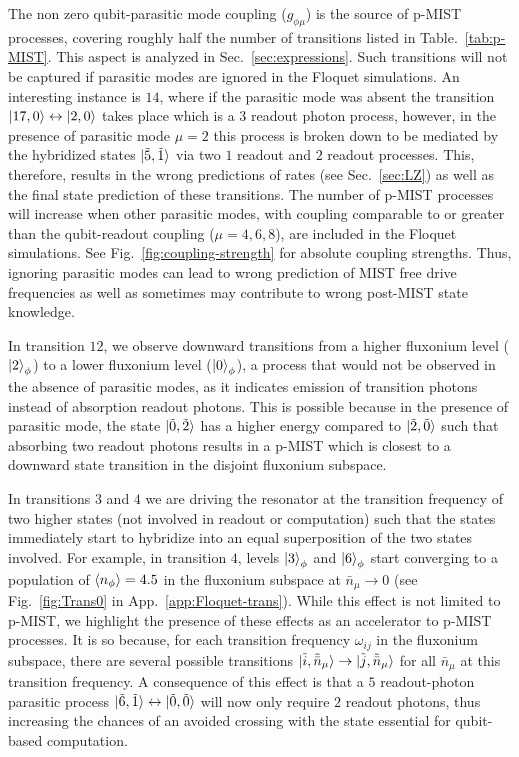 \documentclass[%
reprint,
superscriptaddress,
 amsmath,amssymb,
 aps,
 prx,
longbibliography,
floatfix,
]{revtex4-2}
\begin{document}
The non zero qubit-parasitic mode coupling ($g_{\phi\mu}$) is the source of p-MIST processes, covering roughly half the number of transitions listed in Table.~\ref{tab:p-MIST}. This aspect is analyzed in Sec.~\ref{sec:expressions}. Such transitions will not be captured if parasitic modes are ignored in the Floquet simulations. An interesting instance is $14$, where if the parasitic mode was absent the transition $\ket{17,0}\leftrightarrow \ket{2,0}$ takes place which is a $3$ readout photon process, however, in the presence of parasitic mode $\mu=2$ this process is broken down to be mediated by the hybridized states $\ket{\tilde{5},\tilde{1}}$ via two $1$ readout and $2$ readout processes. This, therefore, results in the wrong predictions of rates (see Sec.~\ref{sec:LZ}) as well as the final state prediction of these transitions. The number of p-MIST processes will increase when other parasitic modes, with coupling comparable to or greater than the qubit-readout coupling ($\mu = 4, 6,8$), are included in the Floquet simulations. See Fig.~\ref{fig:coupling-strength} for absolute coupling strengths. Thus, ignoring parasitic modes can lead to wrong prediction of MIST free drive frequencies as well as sometimes may contribute to wrong post-MIST state knowledge.

In transition $12$, we observe downward transitions from a higher fluxonium level ($\ket{2}_\phi$) to a lower fluxonium level ($\ket{0}_\phi$), a process that would not be observed in the absence of parasitic modes, as it indicates emission of transition photons instead of absorption readout photons. This is possible because in the presence of parasitic mode, the state $\ket{\tilde{0},\tilde{2}}$ has a higher energy compared to $\ket{\tilde{2},\tilde{0}}$ such that absorbing two readout photons results in a p-MIST which is closest to a downward state transition in the disjoint fluxonium subspace. 

In transitions $3$ and $4$ we are driving the resonator at the transition frequency of two higher states (not involved in readout or computation) such that the states immediately start to hybridize into an equal superposition of the two states involved. For example, in transition $4$, levels $\ket{3}_\phi$ and $\ket{6}_\phi$ start converging to a population of $\braket{n_\phi}=4.5$ in the fluxonium subspace at $\bar n_\mu\rightarrow 0$ (see Fig.~\ref{fig:Trans0} in App.~\ref{app:Floquet-trans}). While this effect is not limited to p-MIST, we highlight the presence of these effects as an accelerator to p-MIST processes. It is so because, for each transition frequency $\omega_{ij}$ in the fluxonium subspace, there are several possible transitions $\ket{\tilde{i},\tilde{\bar n}_\mu}\rightarrow \ket{\tilde{j},\tilde{\bar n}_\mu}$ for all $\bar n_\mu$ at this transition frequency. A consequence of this effect is that a $5$ readout-photon parasitic process $\ket{\tilde{6},\tilde{1}}\leftrightarrow\ket{\tilde{0},\tilde{0}}$ will now only require $2$ readout photons, thus increasing the chances of an avoided crossing with the state essential for qubit-based computation.
\end{document}
